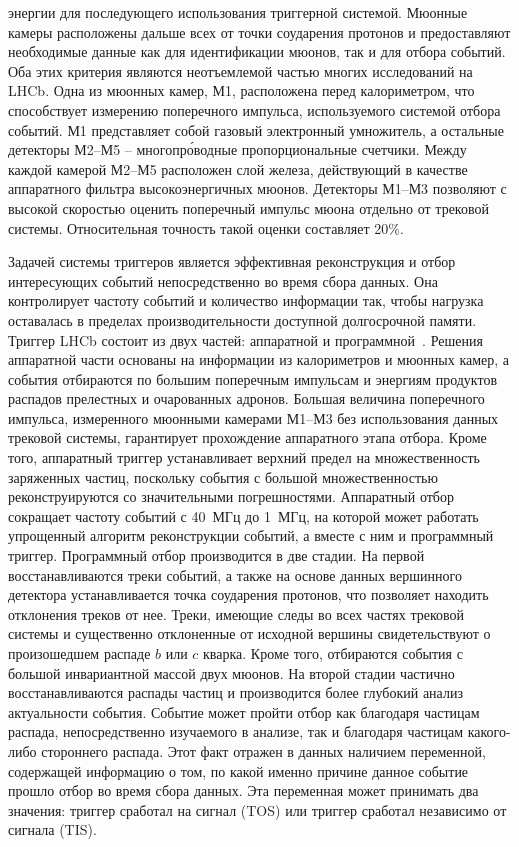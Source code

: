 энергии для последующего использования триггерной системой.
%
Мюонные камеры расположены дальше всех от точки соударения протонов 
и предоставляют необходимые данные как для идентификации мюонов, так 
и для отбора событий. Оба этих критерия являются неотъемлемой частью 
многих исследований на LHCb. Одна из мюонных камер, М1, расположена 
перед калориметром, что способствует измерению поперечного импульса, 
используемого системой отбора событий. М1 представляет собой газовый 
электронный умножитель, а остальные детекторы М2--М5 -- 
многопр\'{о}водные пропорциональные счетчики. Между каждой камерой 
М2--М5 расположен слой железа, действующий в качестве аппаратного 
фильтра высокоэнергичных мюонов. Детекторы М1--М3 позволяют с высокой 
скоростью оценить поперечный импульс мюона отдельно от трековой системы. 
Относительная точность такой оценки составляет 20\%.


Задачей системы триггеров является эффективная реконструкция и отбор 
интересующих событий непосредственно во время сбора данных. Она 
контролирует частоту событий и количество информации так, чтобы нагрузка 
оставалась в пределах производительности доступной долгосрочной памяти.
%
Триггер LHCb состоит из двух частей: аппаратной 
и программной~\cite{LHCb-trigger-Run1, LHCb-trigger-Run2}. Решения 
аппаратной части основаны на информации из калориметров и мюонных камер, 
а события отбираются по большим поперечным импульсам и энергиям 
продуктов распадов прелестных и очарованных адронов. Большая величина 
поперечного импульса, измеренного мюонными камерами М1--М3 без 
использования данных трековой системы, гарантирует прохождение 
аппаратного этапа отбора. Кроме того, аппаратный триггер устанавливает 
верхний предел на множественность заряженных частиц, поскольку события 
с большой множественностью реконструируются со значительными 
погрешностями. Аппаратный отбор сокращает частоту событий с 40~МГц до 
1~МГц, на которой может работать упрощенный алгоритм реконструкции 
событий, а вместе с ним и программный триггер.
%
Программный отбор производится в две стадии. На первой восстанавливаются 
треки событий, а также на основе данных вершинного детектора 
устанавливается точка соударения протонов, что позволяет находить 
отклонения треков от нее. Треки, имеющие следы во всех частях трековой 
системы и существенно отклоненные от исходной вершины свидетельствуют 
о произошедшем распаде $b$ или $c$ кварка. Кроме того, отбираются 
события с большой инвариантной массой двух мюонов. На второй стадии 
частично восстанавливаются распады частиц и производится более глубокий 
анализ актуальности события.
%
Событие может пройти отбор как благодаря частицам распада, 
непосредственно изучаемого в анализе, так и благодаря частицам 
какого-либо стороннего распада. Этот факт отражен в данных наличием 
переменной, содержащей информацию о том, по какой именно причине данное 
событие прошло отбор во время сбора данных. Эта переменная может 
принимать два значения: триггер сработал на сигнал (TOS) или триггер 
сработал независимо от сигнала (TIS).
